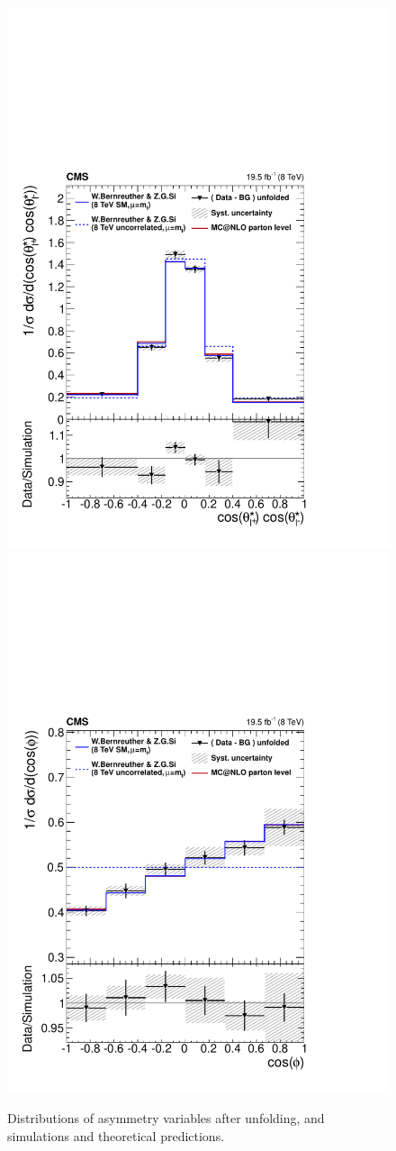 \begin{figure}[hbt]
\begin{center}
\includegraphics[width=0.325\linewidth]{figures/results_1D_topSpinCorr.pdf}
\includegraphics[width=0.325\linewidth]{figures/results_1D_lepCosOpeningAngle.pdf}
\caption{Distributions of asymmetry variables after
  unfolding, and simulations and theoretical predictions.}
\label{fig:afb:results1d}
\end{center}
\end{figure}

